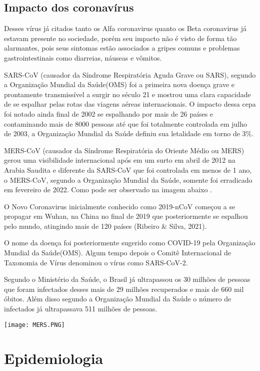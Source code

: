 \subsection{Impacto dos coronavírus }

Desses vírus já citados tanto os Alfa coronavirus quanto os Beta coronavirus já estavam presente no sociedade, porém seu impacto não é visto de forma tão alarmantes, pois seus sintomas estão associados a gripes comuns e problemas gastrointestinais como diarreias, náuseas e vômitos.

SARS-CoV (causador da Síndrome Respiratória Aguda Grave ou SARS), segundo a Organização Mundial da Saúde(OMS) foi a primeira nova doença grave e prontamente transmissível a surgir no século 21 e mostrou uma clara capacidade de se espalhar pelas rotas das viagens aéreas internacionais. O impacto dessa cepa foi notado ainda final de 2002 se espalhando por mais de 26 países e contaminando mais de 8000 pessoas até que foi totalmente controlada em julho de 2003, a Organização Mundial da Saúde definiu sua letalidade em torno de 3\%.

MERS-CoV (causador da Síndrome Respiratória do Oriente Médio ou MERS) gerou uma visibilidade internacional após em um surto em abril de 2012 na Arabia Saudita e diferente da SARS-CoV que foi controlada em menos de 1 ano, o MERS-CoV, segundo a Organização Mundial da Saúde, somente foi erradicado em fevereiro de 2022. Como pode ser observado na imagem abaixo \cite{WHOEMROM33:online}. 

O Novo Coronavirus inicialmente conhecido como 2019-nCoV começou a se propagar em Wuhan, na China no final de 2019 que posteriormente se espalhou pelo mundo, atingindo mais de 120 países (Ribeiro \& Silva, 2021).

O nome da doença foi posteriormente sugerido como COVID-19 pela Organização Mundial da Saúde(OMS). Algum tempo depois o Comitê Internacional de Taxonomia de Vírus denominou o vírus como SARS-CoV-2.

Segundo o Ministério da Saúde, o Brasil já ultrapassou os 30 milhões de pessoas que foram infectados desses mais de 29 milhões recuperados e mais de 660 mil óbitos. Além disso segundo a Organização Mundial da Saúde o número de infectados já ultrapassava 511 milhões de pessoas.

\texttt{[image: MERS.PNG]}

\section{Epidemiologia}

